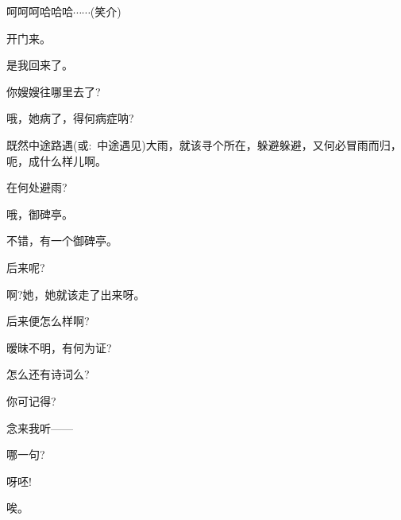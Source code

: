 {{\vspace{5pt}}

{呵呵呵哈哈哈$\cdots{}\cdots{}$({\hwfs 笑}{\hwfs 介})}


{开门来。}\hspace{30pt}~

{是我回来了。}\hspace{30pt}~


{你嫂嫂往哪里去了?}

{哦，她病了，得何病症呐?}\hspace{10pt}~

{既然中途路遇({\akai 或}:~中途遇见)大雨，就该寻个所在，躲避躲避，又何必冒雨而归，呃，成什么样儿啊。}

{在何处避雨?}\hspace{30pt}~

{哦，御碑亭。}\hspace{30pt}~

{不错，有一个御碑亭。}\hspace{10pt}~

{后来呢?}\hspace{30pt}~

{啊?她，她就该走了出来呀。}

{后来便怎么样啊?}\hspace{20pt}~

{暧昧不明，有何为证?}\hspace{10pt}~

{怎么还有诗词么?}\hspace{20pt}~

{你可记得?}\hspace{30pt}~

{念来我听------}\hspace{10pt}~

{哪一句?}\hspace{30pt}~

{呀呸!}\hspace{40pt}~


{唉。}\hspace{40pt}~

}
